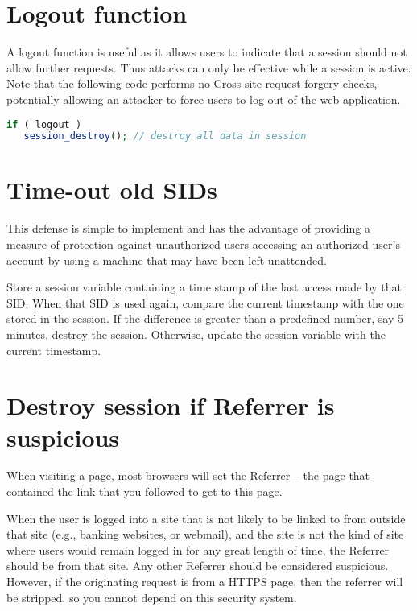 \section{Logout function}

A logout function is useful as it allows users to indicate that a session should not allow further requests. Thus attacks can only be effective while a session is active. Note that the following code performs no Cross-site request forgery checks, potentially allowing an attacker to force users to log out of the web application.

\begin{lstlisting}[language=PHP]
if ( logout )
   session_destroy(); // destroy all data in session
\end{lstlisting}



\section{Time-out old SIDs}

This defense is simple to implement and has the advantage of providing a measure of protection against unauthorized users accessing an authorized user's account by using a machine that may have been left unattended.

Store a session variable containing a time stamp of the last access made by that SID. When that SID is used again, compare the current timestamp with the one stored in the session. If the difference is greater than a predefined number, say 5 minutes, destroy the session. Otherwise, update the session variable with the current timestamp.




\section{Destroy session if Referrer is suspicious}


When visiting a page, most browsers will set the Referrer – the page that contained the link that you followed to get to this page.

When the user is logged into a site that is not likely to be linked to from outside that site (e.g., banking websites, or webmail), and the site is not the kind of site where users would remain logged in for any great length of time, the Referrer should be from that site. Any other Referrer should be considered suspicious. However, if the originating request is from a HTTPS page, then the referrer will be stripped, so you cannot depend on this security system.

